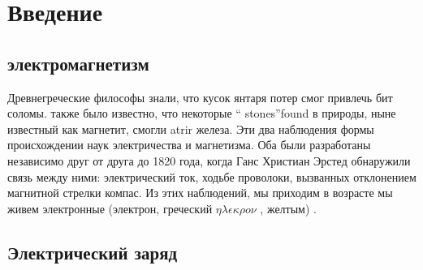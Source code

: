 \section{Введение}

\subsection{электромагнетизм}

Древнегреческие философы знали, что кусок янтаря
потер смог привлечь бит соломы. также
было известно, что некоторые `` stones''found в
природы, ныне известный как магнетит, смогли atrir
железа. Эти два наблюдения формы происхождении наук
электричества и магнетизма. Оба были разработаны
независимо друг от друга до 1820 года, когда Ганс Христиан Эрстед
обнаружили связь между ними: электрический ток,
ходьбе проволоки, вызванных отклонением магнитной стрелки
компас. Из этих наблюдений, мы приходим в возрасте
мы живем электронные (электрон, греческий
$\eta\lambda\epsilon\kappa\rho o\nu$ ,
желтым) \cite{halliday}.

\subsection{Электрический заряд}


